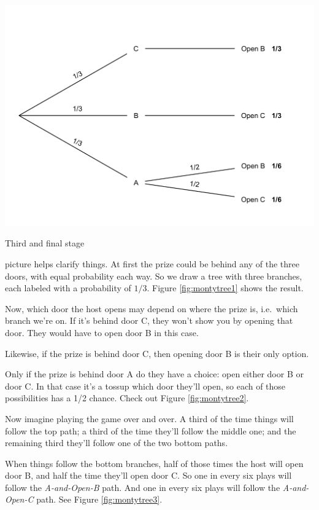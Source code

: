 \documentclass[justified]{tufte-book}
\theoremstyle{definition}
\theoremstyle{definition}
\theoremstyle{definition}
\theoremstyle{remark}
\begin{document}
\begin{marginfigure}
\includegraphics{_main_files/figure-latex/montytree3-1} \caption[Third and final stage]{Third and final stage}\label{fig:montytree3}
\end{marginfigure}

 picture helps clarify things. At first the prize could be behind any of the three doors, with equal probability each way. So we draw a tree with three branches, each labeled with a probability of \(1/3\). Figure \ref{fig:montytree1} shows the result.

Now, which door the host opens may depend on where the prize is, i.e.~which branch we're on. If it's behind door C, they won't show you by opening that door. They would have to open door B in this case.

Likewise, if the prize is behind door C, then opening door B is their only option.

Only if the prize is behind door A do they have a choice: open either door B or door C. In that case it's a tossup which door they'll open, so each of those possibilities has a 1/2 chance. Check out Figure \ref{fig:montytree2}.

Now imagine playing the game over and over. A third of the time things will follow the top path; a third of the time they'll follow the middle one; and the remaining third they'll follow one of the two bottom paths.

When things follow the bottom branches, half of those times the host will open door B, and half the time they'll open door C. So one in every six plays will follow the \emph{A-and-Open-B} path. And one in every six plays will follow the \emph{A-and-Open-C} path. See Figure \ref{fig:montytree3}.
\end{document}
